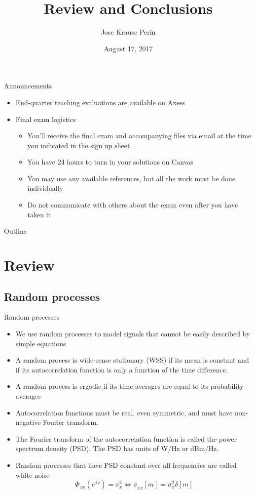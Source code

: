 \documentclass[10pt]{beamer}
\title[EE 264]{Review and Conclusions}
\author{Jose Krause Perin}
\institute{Stanford University}
\date{August 17, 2017}
\begin{document}
\begin{frame}
  \titlepage
\end{frame}

%
\begin{frame}{Announcements}
\begin{itemize}
	\item End-quarter teaching evaluations are available on Axess
	\item Final exam logistics
	\begin{itemize} \normalsize
		\item You'll receive the final exam and accompanying files via email at the time you indicated in the sign up sheet.
		\item You have 24 hours to turn in your solutions on Canvas
		\item You may use any available references, but all the work must be done individually
		\item Do not communicate with others about the exam even after you have taken it
	\end{itemize}
\end{itemize}
\end{frame}

%
\begin{frame}{Outline}
	\tableofcontents
\end{frame}

%
\section{Review}
\subsection{Random processes}
\begin{frame}{Random processes}
\begin{itemize}
	\item We use random processes to model signals that cannot be easily described by simple equations
	\item A random process is wide-sense stationary (WSS) if its mean is constant and if its autocorrelation function is only a function of the time difference. 
	\item A random process is ergodic if its time averages are equal to its probability averages
	\item Autocorrelation functions must be real, even symmetric, and must have non-negative Fourier transform.
	\item The Fourier transform of the autocorrelation function is called the power spectrum density (PSD). The PSD has units of W/Hz or dBm/Hz.
	\item Random processes that have PSD constant over all frequencies are called white noise
	\begin{equation*}
		\Phi_{xx}(e^{j\omega}) = \sigma_x^2 \Longleftrightarrow \phi_{xx}[m] = \sigma_x^2\delta[m] \tag{white noise}
	\end{equation*}
\end{itemize}
\end{frame}
\end{document}
